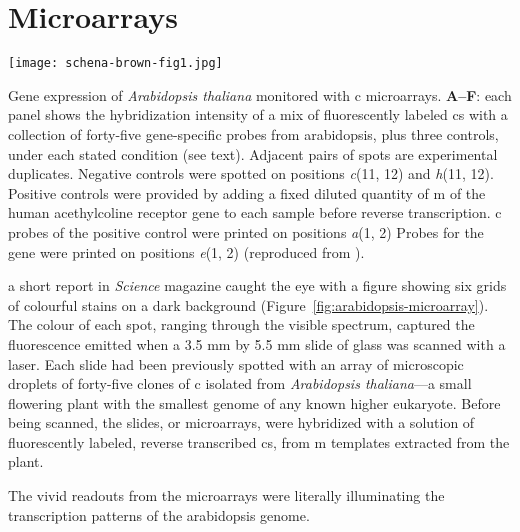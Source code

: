 \section{Microarrays}

\begin{marginfigure}%
  \texttt{[image: schena-brown-fig1.jpg]}
  \caption[Gene expression of \emph{Arabidopsis thaliana} monitored with
  c microarrays]{Gene expression of \emph{Arabidopsis thaliana}
    monitored with c microarrays. \textbf{A--F}: each panel shows
    the hybridization intensity of a mix of fluorescently labeled
    cs with a collection of \mbox{forty-five}
    \mbox{gene-specific} probes from arabidopsis, plus three controls, under
    each stated condition (see text).  Adjacent pairs of spots are experimental
    duplicates.  Negative controls were spotted on positions \emph{c}(11, 12)
    and \emph{h}(11, 12).  Positive controls were provided by adding a fixed
    diluted quantity of m of the human acethylcoline receptor
    gene to each sample before reverse transcription.  c probes
    of the positive control were printed on positions \emph{a}(1, 2) Probes for
    the \emph{} gene were printed on positions \emph{e}(1, 2)
    (reproduced from \citealp{schena_quantitative_1995}).}
  \label{fig:arabidopsis-microarray}
\end{marginfigure}

 a short report in \emph{Science} magazine caught
the eye with a figure showing six grids of colourful stains on a dark background
(Figure~\ref{fig:arabidopsis-microarray}).  The colour of each spot, ranging
through the visible spectrum, captured the fluorescence emitted when a 3.5 mm by
5.5 mm slide of glass was scanned with a laser.  Each slide had been previously
spotted with an array of microscopic droplets of \mbox{forty-five} clones of
c isolated from \emph{Arabidopsis thaliana}---a small flowering
plant with the smallest genome of any known higher eukaryote.  Before being
scanned, the slides, or microarrays, were hybridized with a solution of
fluorescently labeled, reverse transcribed cs, from
m templates extracted from the plant.


The vivid readouts from the microarrays were literally illuminating the
transcription patterns of the arabidopsis genome.

